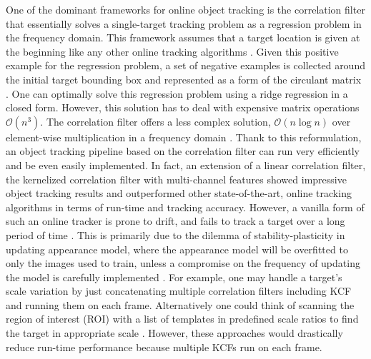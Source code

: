 \documentclass[10pt,twocolumn,letterpaper]{article}
\begin{document}
One of the dominant frameworks for online object tracking is the
correlation filter that essentially solves a single-target tracking
problem as a regression problem in the frequency domain. This
framework assumes that a target location is given at the beginning
like any other online tracking algorithms
\cite{smeulders2014survey}. Given this positive example for the
regression problem, a set of negative examples is collected around the
initial target bounding box and represented as a form of the
circulant matrix \cite{henriques2015high}. One can optimally solve
this regression problem using a ridge regression in a closed
form. However, this solution has to deal with expensive matrix
operations $\mathcal{O}(n^{3})$. The correlation filter offers a less
complex solution, $\mathcal{O}(n\log n)$ over element-wise
multiplication in a frequency domain
\cite{bolme2010visual,henriques2015high}. Thank to this reformulation,
an object tracking pipeline based on the correlation filter can run
very efficiently and be even easily implemented. In fact, an extension
of a linear correlation filter, the kernelized correlation filter with
multi-channel features \cite{henriques2015high} showed impressive
object tracking results and outperformed other state-of-the-art,
online tracking algorithms in terms of run-time and tracking
accuracy. However, a vanilla form of such an online tracker is prone
to drift, and fails to track a target over a long period of time
\cite{henriques2015high}. This is primarily due to the dilemma of
stability-plasticity in updating appearance model, where the
appearance model will be overfitted to only the images used to train,
unless a compromise on the frequency of updating the model is
carefully implemented \cite{santner2010prost}. For example, one may
handle a target's scale variation by just concatenating multiple
correlation filters including KCF and running them on each
frame. Alternatively one could think of scanning the region of
interest (ROI) with a list of templates in predefined scale ratios to
find the target in appropriate scale
\cite{henriques2015high,tang2015multi,ma2015long,bibi2015multi,li2014scale}. However,
these approaches would drastically reduce run-time performance because
multiple KCFs run on each frame.
\end{document}
